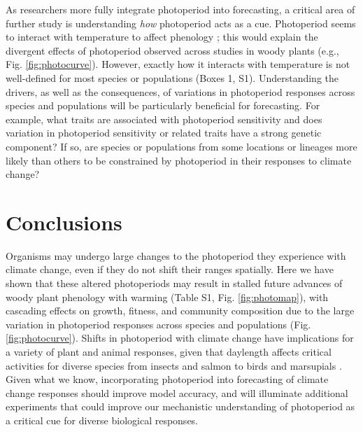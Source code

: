 \documentclass{article}
\begin{document}
\par As researchers more fully integrate photoperiod into forecasting, a critical area of further study is understanding \emph{how} photoperiod acts as a cue. Photoperiod seems to interact with temperature to affect phenology \citep[e.g., ][]{zydlewski2014}; this would explain the divergent effects of photoperiod observed across studies in woody plants (e.g., Fig. \ref{fig:photocurve}). However, exactly how it interacts with temperature is not well-defined for most species or populations (Boxes 1, S1).  Understanding the drivers, as well as the consequences, of variations in photoperiod responses across species and populations will be particularly beneficial for forecasting. For example, what traits are associated with photoperiod sensitivity and does variation in photoperiod sensitivity or related traits have a strong genetic component? If so, are species or populations from some locations or lineages more likely than others to be constrained by photoperiod in their responses to climate change?

\section*{Conclusions}
Organisms may undergo large changes to the photoperiod they experience with climate change, even if they do not shift their ranges spatially. Here we have shown that these altered photoperiods may result in stalled future advances of woody plant phenology with warming (Table S1, Fig. \ref{fig:photomap}), with cascading effects on growth, fitness, and community composition due to the large variation in photoperiod responses across species and populations (Fig. \ref{fig:photocurve}). Shifts in photoperiod with climate change have implications for a variety of plant and animal responses, given that daylength affects critical activities for diverse species from insects \citep{bradshaw2006,linn1996} and salmon \citep{solbakken1994,taranger2003} to birds \citep{dawson2001} and marsupials \citep{mcallan2006,solbakken1994}. Given what we know, incorporating photoperiod into forecasting of climate change responses should improve model accuracy, and will illuminate additional experiments that could improve our mechanistic understanding of photoperiod as a critical cue for diverse biological responses. 
\end{document}
